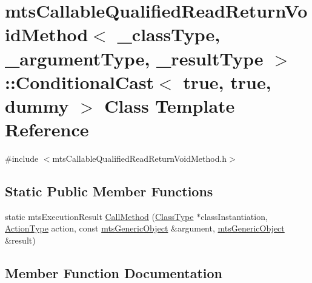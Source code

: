 \hypertarget{classmts_callable_qualified_read_return_void_method_1_1_conditional_cast_3_01true_00_01true_00_01dummy_01_4}{}\section{mts\+Callable\+Qualified\+Read\+Return\+Void\+Method$<$ \+\_\+class\+Type, \+\_\+argument\+Type, \+\_\+result\+Type $>$\+:\+:Conditional\+Cast$<$ true, true, dummy $>$ Class Template Reference}
\label{classmts_callable_qualified_read_return_void_method_1_1_conditional_cast_3_01true_00_01true_00_01dummy_01_4}


{\ttfamily \#include $<$mts\+Callable\+Qualified\+Read\+Return\+Void\+Method.\+h$>$}

\subsection*{Static Public Member Functions}
\begin{DoxyCompactItemize}
\item 
static mts\+Execution\+Result \hyperlink{classmts_callable_qualified_read_return_void_method_1_1_conditional_cast_3_01true_00_01true_00_01dummy_01_4_a62882dd067f4bff81aa255550358e445}{Call\+Method} (\hyperlink{classmts_callable_qualified_read_return_void_method_ae99cfab8208eb374f2cdf01c97edfa3b}{Class\+Type} $\ast$class\+Instantiation, \hyperlink{classmts_callable_qualified_read_return_void_method_a90bf5eae1c7fdee0396313ce6de022bb}{Action\+Type} action, const \hyperlink{classmts_generic_object}{mts\+Generic\+Object} \&argument, \hyperlink{classmts_generic_object}{mts\+Generic\+Object} \&result)
\end{DoxyCompactItemize}


\subsection{Member Function Documentation}
\hypertarget{classmts_callable_qualified_read_return_void_method_1_1_conditional_cast_3_01true_00_01true_00_01dummy_01_4_a62882dd067f4bff81aa255550358e445}{}
